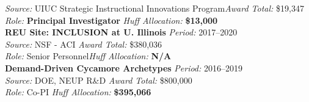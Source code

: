 \documentclass[margin,line]{resume}
\begin{document}
\begin{resume}
    \textsl{Source:} UIUC Strategic Instructional Innovations Program\hfill \textsl{Award Total:} \$19,347\\
    \textsl{Role:} \textbf{Principal Investigator}  \hfill \textsl{Huff Allocation:} \textbf{\$13,000}\vspace{2mm}\\%
    \textbf{REU Site: INCLUSION at U. Illinois} \hfill \textsl{Period:}
    2017--2020\\
    \textsl{Source:} NSF - ACI \hfill \textsl{Award Total:} \$380,036\\
    \textsl{Role:} Senior Personnel\hfill \textsl{Huff Allocation:} \textbf{N/A}\vspace{2mm}\\%
    \textbf{Demand-Driven Cycamore Archetypes} \hfill \textsl{Period:} 2016--2019\\
    \textsl{Source:} DOE, NEUP R\&D \hfill \textsl{Award Total:} \$800,000\\
    \textsl{Role:} Co-PI \hfill \textsl{Huff Allocation:} \textbf{\$395,066}\vspace{2mm}\\%

\end{resume}
\end{document}
